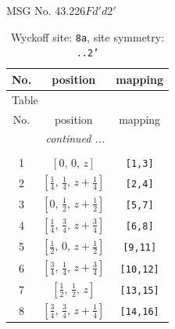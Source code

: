 \documentclass[fleqn,8pt]{jsarticle}
\begin{document}
\setcounter{MaxMatrixCols}{32}

\renewcommand{\tablename}{Table~}
\renewcommand{\figurename}{Figure~}
\begin{center}
\LARGE
MSG No. 43.226\quad$Fd'd2'$
\end{center}
\renewcommand{\arraystretch}{1.2}
\begin{longtable}{ccc}
\caption{Wyckoff site: {\tt 8a}, site symmetry: {\tt ..2'}}
 \\
 \hline \hline
No. & position & mapping \\ \hline \endfirsthead

\multicolumn{2}{l}{\tablename\ \thetable{}} \\
 \hline \hline
No. & position & mapping \\ \hline \endhead

 \hline \hline
\multicolumn{2}{r}{\footnotesize\it continued ...} \\ \endfoot

 \hline \hline
\multicolumn{2}{r}{} \\ \endlastfoot

1 & $\left[ 0,\, 0,\, z \right]$ & {\tt [1,3]} \\ \hline
2 & $\left[ \frac{1}{4},\, \frac{1}{4},\, z + \frac{1}{4} \right]$ & {\tt [2,4]} \\ \hline
3 & $\left[ 0,\, \frac{1}{2},\, z + \frac{1}{2} \right]$ & {\tt [5,7]} \\ \hline
4 & $\left[ \frac{1}{4},\, \frac{3}{4},\, z + \frac{3}{4} \right]$ & {\tt [6,8]} \\ \hline
5 & $\left[ \frac{1}{2},\, 0,\, z + \frac{1}{2} \right]$ & {\tt [9,11]} \\ \hline
6 & $\left[ \frac{3}{4},\, \frac{1}{4},\, z + \frac{3}{4} \right]$ & {\tt [10,12]} \\ \hline
7 & $\left[ \frac{1}{2},\, \frac{1}{2},\, z \right]$ & {\tt [13,15]} \\ \hline
8 & $\left[ \frac{3}{4},\, \frac{3}{4},\, z + \frac{1}{4} \right]$ & {\tt [14,16]} \\
\end{longtable}
\renewcommand{\arraystretch}{1.2}
\end{document}
